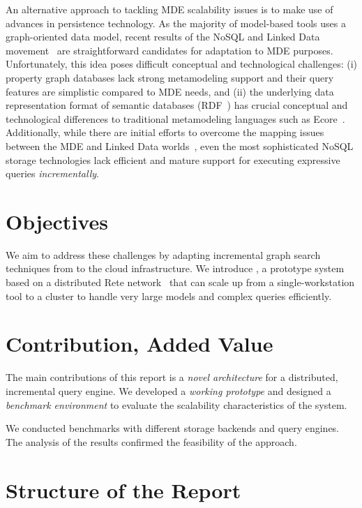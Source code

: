 An alternative approach to tackling MDE scalability issues is to make use of advances in persistence technology. As the majority of model-based tools uses a graph-oriented data model, recent results of the NoSQL and Linked Data movement~\cite{neo4j,openvirtuoso,sesame} are straightforward candidates for adaptation to MDE purposes. Unfortunately, this idea poses difficult conceptual and technological challenges: (i) property graph databases lack strong metamodeling support and their query features are simplistic compared to MDE needs, and (ii) the underlying data representation format of semantic databases (RDF~\cite{website:rdf_standard}) has crucial conceptual and technological differences to traditional metamodeling languages such as Ecore~\cite{EMF}. Additionally, while there are initial efforts to overcome the mapping issues between the MDE and Linked Data worlds~\cite{hillairet2008bridging}, even the most sophisticated NoSQL storage technologies lack efficient and mature support for executing expressive queries \emph{incrementally}.

\section{Objectives}


We aim to address these challenges by adapting incremental graph search techniques from \eiq{} to the cloud infrastructure. We introduce \iqd{}, a prototype system based on a distributed Rete network~\cite{Forgy} that can scale up from a single-workstation tool to a cluster to handle very large models and complex queries efficiently.

\section{Contribution, Added Value}
 
The main contributions of this report is a \emph{novel architecture} for a distributed, incremental query engine. We developed a \emph{working prototype} and designed a \emph{benchmark environment} to evaluate the scalability characteristics of the system. 

We conducted benchmarks with different storage backends and query engines. The analysis of the results confirmed the feasibility of the approach.

\section{Structure of the Report}
 
